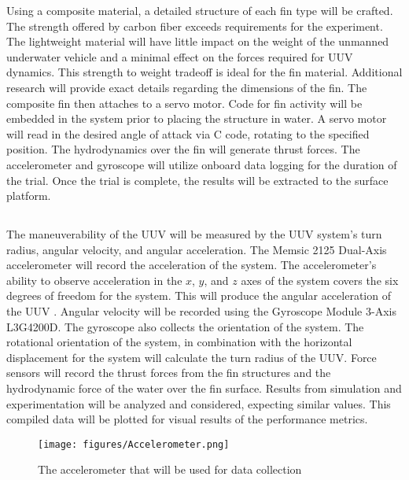 \documentclass[]{IEEEtran}
\begin{document}
Using a composite material, a detailed structure of each fin type will be crafted.  The strength offered by carbon fiber exceeds requirements for the experiment.  The lightweight material will have little impact on the weight of the unmanned underwater vehicle and a minimal effect on the forces required for UUV dynamics.  This strength to weight tradeoff is ideal for the fin material.  Additional research will provide exact details regarding the dimensions of the fin.  The composite fin then attaches to a servo motor.  Code for fin activity will be embedded in the system prior to placing the structure in water.  A servo motor will read in the desired angle of attack via C code, rotating to the specified position.  The hydrodynamics over the fin will generate thrust forces.  The accelerometer and gyroscope will utilize onboard data logging for the duration of the trial.  Once the trial is complete, the results will be extracted to the surface platform.  

\subsection{}
The maneuverability of the UUV will be measured by the UUV system’s turn radius, angular velocity, and angular acceleration. The Memsic 2125 Dual-Axis accelerometer will record the acceleration of the system.  The accelerometer’s ability to observe acceleration in the $x$, $y$, and $z$ axes of the system covers the six degrees of freedom for the system.  This will produce the angular acceleration of the UUV \cite{parallax2013}.  Angular velocity will be recorded using the Gyroscope Module 3-Axis L3G4200D.  The gyroscope also collects the orientation of the system.  The rotational orientation of the system, in combination with the horizontal displacement for the system will calculate the turn radius of the UUV.  Force sensors will record the thrust forces from the fin structures and the hydrodynamic force of the water over the fin surface.  Results from simulation and experimentation will be analyzed and considered, expecting similar values.  This compiled data will be plotted for visual results of the performance metrics.  
\begin{figure}
\begin{center}
\texttt{[image: figures/Accelerometer.png]}
\end{center}
\caption{The accelerometer that will be used for data collection \cite{parallax2013}}
\label{fig:6}
\end{figure}
\end{document}
